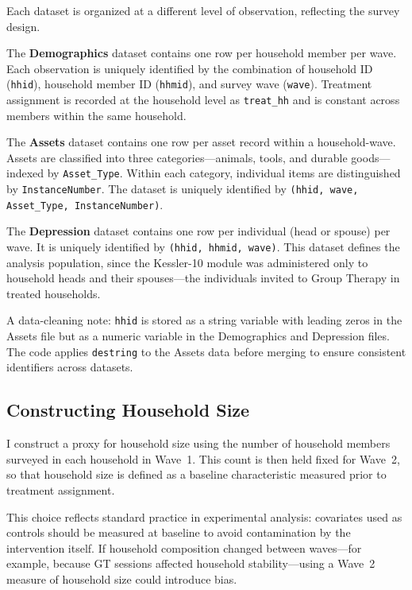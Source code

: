 \documentclass[12pt]{article}
\begin{document}
Each dataset is organized at a different level of observation, reflecting the survey design.

The \textbf{Demographics} dataset contains one row per household member per wave. Each observation is uniquely identified by the combination of household ID (\texttt{hhid}), household member ID (\texttt{hhmid}), and survey wave (\texttt{wave}). Treatment assignment is recorded at the household level as \texttt{treat\_hh} and is constant across members within the same household.

The \textbf{Assets} dataset contains one row per asset record within a household-wave. Assets are classified into three categories---animals, tools, and durable goods---indexed by \texttt{Asset\_Type}. Within each category, individual items are distinguished by \texttt{InstanceNumber}. The dataset is uniquely identified by \texttt{(hhid, wave, Asset\_Type, InstanceNumber)}.

The \textbf{Depression} dataset contains one row per individual (head or spouse) per wave. It is uniquely identified by \texttt{(hhid, hhmid, wave)}. This dataset defines the analysis population, since the Kessler-10 module was administered only to household heads and their spouses---the individuals invited to Group Therapy in treated households.

A data-cleaning note: \texttt{hhid} is stored as a string variable with leading zeros in the Assets file but as a numeric variable in the Demographics and Depression files. The code applies \texttt{destring} to the Assets data before merging to ensure consistent identifiers across datasets.


\subsection{Constructing Household Size}

I construct a proxy for household size using the number of household members surveyed in each household in Wave~1. This count is then held fixed for Wave~2, so that household size is defined as a baseline characteristic measured prior to treatment assignment.

This choice reflects standard practice in experimental analysis: covariates used as controls should be measured at baseline to avoid contamination by the intervention itself. If household composition changed between waves---for example, because GT sessions affected household stability---using a Wave~2 measure of household size could introduce bias.
\end{document}
